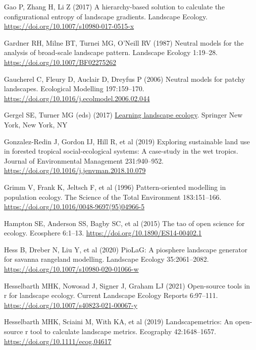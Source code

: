 \documentclass[
  10pt,
  a4paperpaper,
]{article}
\newlength{\cslhangindent}
\newenvironment{CSLReferences}[2] %
 {\begin{list}{}{%
  \setlength{\itemindent}{0pt}
  \setlength{\leftmargin}{0pt}
  \setlength{\parsep}{0pt}
  \ifodd #1
   \setlength{\leftmargin}{\cslhangindent}
   \setlength{\itemindent}{-1\cslhangindent}
  \fi
  \setlength{\itemsep}{#2\baselineskip}}}
 {\end{list}}
\begin{document}
\begin{CSLReferences}{1}{1}
Gao P, Zhang H, Li Z (2017) A hierarchy-based solution to calculate the
configurational entropy of landscape gradients. Landscape Ecology.
\url{https://doi.org/10.1007/s10980-017-0515-x}

Gardner RH, Milne BT, Turnei MG, O'Neill RV (1987) Neutral models for
the analysis of broad-scale landscape pattern. Landscape Ecology
1:19--28. \url{https://doi.org/10.1007/BF02275262}

Gaucherel C, Fleury D, Auclair D, Dreyfus P (2006) Neutral models for
patchy landscapes. Ecological Modelling 197:159--170.
\url{https://doi.org/10.1016/j.ecolmodel.2006.02.044}

Gergel SE, Turner MG (eds) (2017)
\href{https://doi.org/10.1007/978-1-4939-6374-4}{Learning landscape
ecology}. Springer New York, New York, NY

Gonzalez-Redin J, Gordon IJ, Hill R, et al (2019) Exploring sustainable
land use in forested tropical social-ecological systems: A case-study in
the wet tropics. Journal of Environmental Management 231:940--952.
\url{https://doi.org/10.1016/j.jenvman.2018.10.079}

Grimm V, Frank K, Jeltsch F, et al (1996) Pattern-oriented modelling in
population ecology. The Science of the Total Environment 183:151--166.
\url{https://doi.org/10.1016/0048-9697(95)04966-5}

Hampton SE, Anderson SS, Bagby SC, et al (2015) The tao of open science
for ecology. Ecosphere 6:1--13.
\url{https://doi.org/10.1890/ES14-00402.1}

Hess B, Dreber N, Liu Y, et al (2020) PioLaG: A piosphere landscape
generator for savanna rangeland modelling. Landscape Ecology
35:2061--2082. \url{https://doi.org/10.1007/s10980-020-01066-w}

Hesselbarth MHK, Nowosad J, Signer J, Graham LJ (2021) Open-source tools
in r for landscape ecology. Current Landscape Ecology Reports 6:97--111.
\url{https://doi.org/10.1007/s40823-021-00067-y}

Hesselbarth MHK, Sciaini M, With KA, et al (2019) Landscapemetrics: An
open-source r tool to calculate landscape metrics. Ecography
42:1648--1657. \url{https://doi.org/10.1111/ecog.04617}


\end{CSLReferences}
\end{document}
